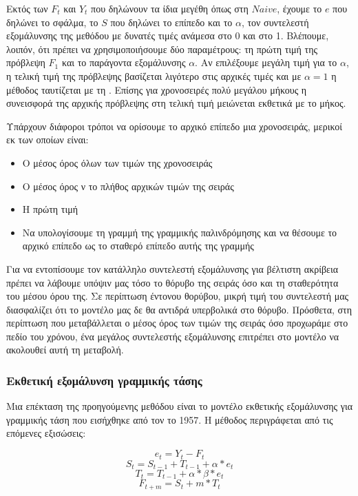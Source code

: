 Εκτός των $F_t$ και $Y_t$ που δηλώνουν τα ίδια μεγέθη όπως στη $Naive$, έχουμε το $e$ που δηλώνει το σφάλμα, το $S$ που δηλώνει το επίπεδο και το $\alpha$, τον συντελεστή εξομάλυνσης της μεθόδου με δυνατές τιμές ανάμεσα στο 0 και στο 1.
Βλέπουμε, λοιπόν, ότι πρέπει να χρησιμοποιήσουμε δύο παραμέτρους: τη πρώτη τιμή της πρόβλεψη $F_1$ και το παράγοντα εξομάλυνσης $\alpha$. Αν επιλέξουμε μεγάλη τιμή για το $\alpha$, η τελική τιμή της πρόβλεψης βασίζεται λιγότερο στις αρχικές τιμές και με $\alpha = 1$ η μέθοδος ταυτίζεται με τη . Επίσης για χρονοσειρές πολύ μεγάλου μήκους η συνεισφορά της αρχικής πρόβλεψης στη τελική τιμή μειώνεται εκθετικά με το μήκος. 

Υπάρχουν διάφοροι τρόποι να ορίσουμε το αρχικό επίπεδο μια χρονοσειράς, μερικοί εκ των οποίων είναι:

\begin{itemize}
    \item Ο μέσος όρος όλων των τιμών της χρονοσειράς
    \item Ο μέσος όρος ν το πλήθος αρχικών τιμών της σειράς 
    \item Η πρώτη τιμή 
    \item Να υπολογίσουμε τη γραμμή της γραμμικής παλινδρόμησης και να θέσουμε το αρχικό επίπεδο ως το σταθερό επίπεδο αυτής της γραμμής
  \end{itemize}

Για να εντοπίσουμε τον κατάλληλο συντελεστή εξομάλυνσης για βέλτιστη ακρίβεια πρέπει να λάβουμε υπόψιν μας τόσο το θόρυβο της σειράς όσο και τη σταθερότητα του μέσου όρου της. Σε περίπτωση έντονου θορύβου, μικρή τιμή του συντελεστή μας διασφαλίζει ότι το μοντέλο μας δε θα αντιδρά υπερβολικά στο θόρυβο. Πρόσθετα, στη περίπτωση που μεταβάλλεται ο μέσος όρος των τιμών της σειράς όσο προχωράμε στο πεδίο του χρόνου, ένα μεγάλος συντελεστής εξομάλυνσης επιτρέπει στο μοντέλο να ακολουθεί αυτή τη μεταβολή. 


\subsubsection{Εκθετική εξομάλυνση γραμμικής τάσης}

Μια επέκταση της προηγούμενης μεθόδου είναι το μοντέλο εκθετικής εξομάλυνσης για γραμμικής τάση  που εισήχθηκε από τον  το 1957. Η μέθοδος περιγράφεται από τις επόμενες εξισώσεις:

\[ e_t = Y_t - F_t \]
\[ S_t = S_{t-1} + T_{t-1} + \alpha * e_t \]
\[ T_t =  T_{t-1} + \alpha * \beta * e_t \]
\[ F_{t+m} = S_t + m * T_t \]

